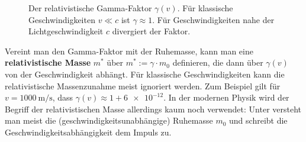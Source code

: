 \begin{figure}[htbp]
    \centering
    \caption{Der relativistische Gamma-Faktor $\gamma(v)$. Für klassische Geschwindigkeiten $v \ll c$ ist $\gamma\approx 1$. Für Geschwindigkeiten nahe der Lichtgeschwindigkeit $c$ divergiert der Faktor.}\label{fig: gamma_faktor_gamma_von_v}
\end{figure}
Vereint man den Gamma-Faktor mit der Ruhemasse, kann man eine \textbf{relativistische Masse} $m^{*}$ über $m^{*}:=\gamma \cdot m_{0}$ definieren, die dann über $\gamma(v)$ von der Geschwindigkeit abhängt. Für klassische Geschwindigkeiten kann die relativistische Massenzunahme meist ignoriert werden. Zum Beispiel gilt für $v = \SI{1000}{\meter\per\second}$, dass $\gamma(v) \approx 1 + \num{6e-12}$. In der modernen Physik wird der Begriff der relativistischen Masse allerdings kaum noch verwendet: Unter  versteht man meist die (geschwindigkeitsunabhängige) Ruhemasse $m_0$ und schreibt die Geschwindigkeitsabhängigkeit dem Impuls zu.


